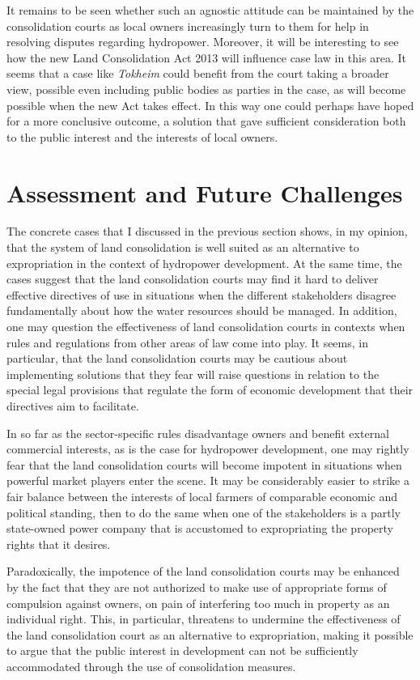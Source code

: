 It remains to be seen whether such an agnostic attitude can be maintained by the consolidation courts as local owners increasingly turn to them for help in resolving disputes regarding hydropower. Moreover, it will be interesting to see how the new Land Consolidation Act 2013 will influence case law in this area. It seems that a case like \emph{Tokheim} could benefit from the court taking a broader view, possible even including public bodies as parties in the case, as will become possible when the new Act takes effect. In this way one could perhaps have hoped for a more conclusive outcome, a solution that gave sufficient consideration both to the public interest and the interests of local owners.

\section{Assessment and Future Challenges}\label{sec:lca}

The concrete cases that I discussed in the previous section shows, in my opinion, that the system of land consolidation is well suited as an alternative to expropriation in the context of hydropower development. At the same time, the cases suggest that the land consolidation courts may find it hard to deliver effective directives of use in situations when the different stakeholders disagree fundamentally about how the water resources should be managed. In addition, one may question the effectiveness of land consolidation courts in contexts when rules and regulations from other areas of law come into play. It seems, in particular, that the land consolidation courts may be cautious about implementing solutions that they fear will raise questions in relation to the special legal provisions that regulate the form of economic development that their directives aim to facilitate.

In so far as the sector-specific rules disadvantage owners and benefit external commercial interests, as is the case for hydropower development, one may rightly fear that the land consolidation courts will become impotent in situations when powerful market players enter the scene. It may be considerably easier to strike a fair balance between the interests of local farmers of comparable economic and political standing, then to do the same when one of the stakeholders is a partly state-owned power company that is accustomed to expropriating the property rights that it desires.

Paradoxically, the impotence of the land consolidation courts may be enhanced by the fact that they are not authorized to make use of appropriate forms of compulsion against owners, on pain of interfering too much in property as an individual right. This, in particular, threatens to undermine the effectiveness of the land consolidation court as an alternative to expropriation, making it possible to argue that the public interest in development can not be sufficiently accommodated through the use of consolidation measures. 

